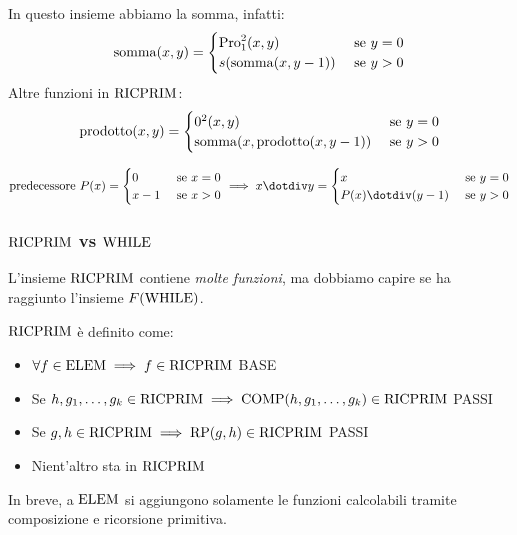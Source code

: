 In questo insieme abbiamo la somma, infatti: 
$$
\operatorname{somma}(x,y) = \begin{cases}
	\text{Pro}_1^2 (x,y) & \text{ se } y = 0 \\
	s (\operatorname{somma}(x, y-1)) & \text{ se } y > 0 \\
\end{cases}
$$
Altre funzioni in $\text{RICPRIM}$:
$$ 
\operatorname{prodotto} (x,y) = \begin{cases}
	0^2 (x,y) & \text{ se } y = 0 \\
	\operatorname{somma}(x, \operatorname{prodotto}(x, y-1)) & \text{ se } y > 0 \\
\end{cases}
$$

$$
\predecessore \, P(x) = \begin{cases}
	0 & \text{ se } x = 0 \\
	x-1 & \text{ se } x > 0
\end{cases}
\implies 
x \dotminus y = \begin{cases}
	x & \text{ se } y = 0 \\
	P(x) \dotminus (y-1) & \text{ se $y > 0$}
\end{cases}
$$

\subsubsection{$\text{RICPRIM}$ vs $\text{WHILE}$}

L'insieme $\text{RICPRIM}$ contiene \textit{molte funzioni}, ma dobbiamo capire se ha raggiunto l'insieme $F(\text{WHILE})$.

$\text{RICPRIM}$ è definito come: 
\begin{itemize}
	\item $\forall f \in \text{ELEM} \implies f \in \text{RICPRIM}$ \hfill BASE
	
    \item Se $h, g_1, \dots, g_k \in \text{RICPRIM} \implies \text{COMP}(h, g_1, \dots, g_k) \in \text{RICPRIM}$ \hfill PASSI
	
    \item Se $g,h \in \text{RICPRIM} \implies \text{RP} (g,h) \in \text{RICPRIM}$ \hfill PASSI
	
    \item Nient'altro sta in $\text{RICPRIM}$
\end{itemize}

In breve, a $\text{ELEM}$ si aggiungono solamente le funzioni calcolabili tramite composizione e ricorsione primitiva. \\

